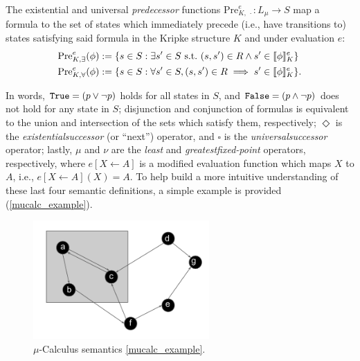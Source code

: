 \vspace*{2.2mm}
\noindent
The existential and universal {\em predecessor\/} functions $\text{Pre}_{K,\ \cdot}^e:L_\mu \to S$ map a \mucalc{} formula to the set of states which immediately precede (i.e., have transitions to) states satisfying said formula in the Kripke structure $K$ and under evaluation $e$:
\begin{align*}
    \Pree{\phi} &:= \{ s \in S : \exists s' \in S \ \text{s.t.} \ (s,s') \in R \land s' \in \brackets{\phi}_K^e\} \\
    \Prea{\phi} &:= \{ s \in S : \forall s' \in S, (s,s') \in R \implies s' \in \brackets{\phi}_K^e\}.
\end{align*}

In words, ${\texttt{True}}{} = (p \lor \lnot p)$ holds for all states in $S$, and ${\texttt{False}}{} = (p \land \lnot p)$ does not hold for any state in $S$; disjunction and conjunction of formulas is equivalent to the union and intersection of the sets which satisfy them, respectively; $\Diamond$ is the {\em existential\/successor} (or ``next'') operator, and $\square$ is the {\em universal\/successor} operator; lastly, $\mu$ and $\nu$ are the {\em least\/} and {\em greatest\/fixed-point} operators, respectively, where $e[X \leftarrow A]$ is a modified evaluation function which maps $X$ to $A$, i.e., $e[X \leftarrow A](X) = A$. To help build a more intuitive understanding of these last four semantic definitions, a simple example is provided (\autoref{mucalc_example}).

\begin{figure}[!ht]
    \centering
    \includegraphics[width=0.6\textwidth]{./figures/mucalc_example}
    \caption[$\mu$-Calculus semantics example]{$\mu$-Calculus semantics \autoref{mucalc_example}.}
\label{fig:mucalc_example}
\end{figure}

